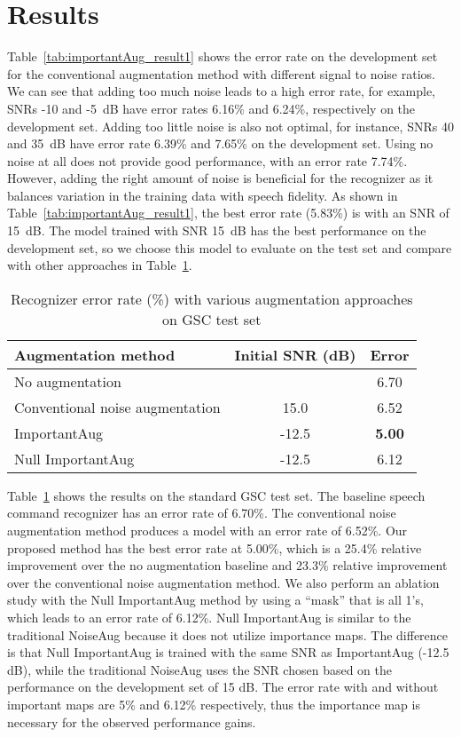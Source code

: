 \documentclass{article}
\begin{document}
\section{Results}
Table~\ref{tab:importantAug_result1} shows the error rate on the development set for the conventional augmentation method with different signal to noise ratios. We can see that adding too much noise leads to a high error rate, for example, SNRs -10 and -5~dB have error rates 6.16\% and 6.24\%, respectively on the development set. Adding too little noise is also not optimal, for instance, SNRs 40 and 35~dB have error rate 6.39\% and 7.65\% on the development set. Using no noise at all does not provide good performance, with an error rate 7.74\%. However, adding the right amount of noise is beneficial for the recognizer as it balances variation in the training data with speech fidelity. As shown in Table~\ref{tab:importantAug_result1}, the best error rate (5.83\%) is with an SNR of 15~dB. The model trained with SNR 15~dB has the best performance on the development set, so we choose this model to evaluate on the test set and compare with other approaches in Table~\ref{tab:importantAug_result2}. 

\begin{table}
  \caption{Recognizer error rate (\%) with various augmentation approaches on GSC test set} \label{tab:importantAug_result2}
  \begin{center}
\begin{tabular}{lcc}
    \toprule
      Augmentation method & Initial SNR (dB) & Error \\
     \midrule
     No augmentation &   & 6.70 \\
      Conventional noise augmentation & 15.0 & 6.52  \\
      ImportantAug & -12.5 & \textbf{5.00} \\
      Null ImportantAug & -12.5 & 6.12 \\
      \bottomrule
    \end{tabular}
  \end{center}
\end{table}

Table~\ref{tab:importantAug_result2} shows the results on the standard GSC test set. The baseline speech command recognizer has an error rate of 6.70\%. The conventional noise augmentation method produces a model with an error rate of 6.52\%. Our proposed method has the best error rate at 5.00\%, which is a 25.4\% relative improvement over the no augmentation baseline and 23.3\% relative improvement over the conventional noise augmentation method. We also perform an ablation study with the Null ImportantAug method by using a ``mask'' that is all 1's, which leads to an error rate of 6.12\%. Null ImportantAug is similar to the traditional NoiseAug because it does not utilize importance maps. The difference is that Null ImportantAug is trained with the same SNR as ImportantAug (-12.5 dB), while the traditional NoiseAug uses the SNR chosen based on the
performance on the development set of 15 dB. The error rate with and without important maps are 5\% and 6.12\% respectively,  thus the importance map is necessary for the observed performance gains.
\end{document}
